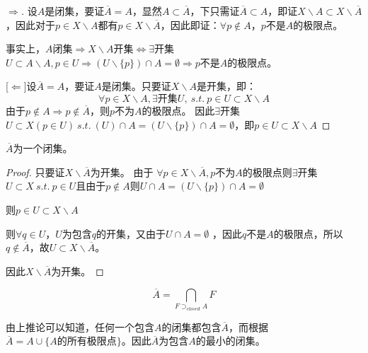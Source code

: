 \documentclass[lang=cn,10pt,device=pad]{elegantbook}
\newcommand{\st}{~s.t.~}
\newcommand{\dkh}[1]{\{#1\}}
\newcommand{\chadiao}{\backslash}
\begin{document}
\begin{proof}[$\Rightarrow$]设$A$是闭集，要证$\overline{A} = A$，显然$A \subset\overline{A}$，下只需证$\overline{A} \subset A$，即证$X\chadiao A\subset X\chadiao\overline{A}$，因此对于$p\in X\chadiao A$都有$p\in X\chadiao\overline{A}$，因此即证：$\forall p \notin A$，$p$不是$A$的极限点。

事实上，$A$闭集$\Rightarrow X\chadiao A$开集$\iff  \exists$开集$U\subset A\chadiao A , p\in U \Rightarrow (U\chadiao\dkh{p})\cap A =\emptyset \Rightarrow p$不是$A$的极限点。

  
	[$\Leftarrow$]设$\overline{A} = A$，要证$A$是闭集。只要证$X\chadiao A$是开集，即：
	\begin{equation*}
		\forall p\in X\chadiao A , \exists \text{开集}U , \st p\in U\subset X\chadiao A
	\end{equation*}
	由于$p\notin A\Rightarrow p\notin \overline{A}$，则$p$不为$A$的极限点。
	因此$\exists $开集$U\subset X(p\in U) \st (U)\cap A = (U\chadiao \dkh{p})\cap A = \emptyset $，即$p\in U\subset X\chadiao A$
\end{proof}
\begin{corollary}
	\begin{center}
		$\overline{A}$为一个闭集。
	\end{center}
\end{corollary}
\begin{proof}
	只要证$X\chadiao \overline{A}$为开集。 由于
$
		\forall p \in X\chadiao \overline{A} ,  p\text{不为}A\text{的极限点}
$则$\exists$开集$U\subset X \st p\in U$且由于$p\notin A$则$U\cap A = (U\chadiao \dkh{p}) \cap A  = \emptyset$

则$p\in U\subset X\chadiao A$

则$\forall q\in U$，$U$为包含$q$的开集，又由于$U\cap A =\emptyset$ ，因此$q$不是$A$的极限点，所以$q\notin \overline{A}$，故$U\subset X\chadiao \overline{A}$。

因此$X\chadiao\overline{A}$为开集。
\end{proof}
\begin{corollary}
	\begin{equation*}
		\overline{A} = \bigcap_{F\supset_{closed}A} F
	\end{equation*}
\end{corollary}
	
	\begin{note}
	由上推论可以知道，任何一个包含$A$的闭集都包含$\overline{A}$，而根据$\overline{A} = A \cup \dkh{A\text{的所有极限点}}$。因此$\overline{A}$为包含$A$的最小的闭集。	
	\end{note}
\end{document}
